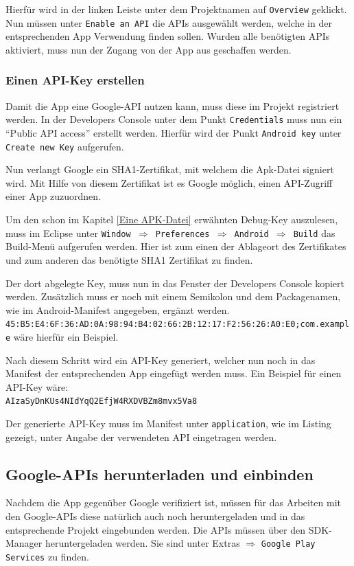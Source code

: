 Hierf\"ur wird in der linken Leiste unter dem Projektnamen auf \texttt{Overview} geklickt. Nun m\"ussen unter \texttt{Enable an API} die APIs ausgew\"ahlt werden, welche in der entsprechenden App Verwendung finden sollen. Wurden alle ben\"otigten APIs aktiviert, muss nun der Zugang von der App aus geschaffen werden. \cite{GDevMaps}

\subsubsection{Einen API-Key erstellen}
Damit die App eine Google-API nutzen kann, muss diese im Projekt registriert werden. In der Developers Console unter dem Punkt \texttt{Credentials} muss nun ein "`Public API access"' erstellt werden. Hierf\"ur wird der Punkt \texttt{Android key} unter \texttt{Create new Key} aufgerufen. 

Nun verlangt Google ein SHA1-Zertifikat, mit welchem die Apk-Datei signiert wird. Mit Hilfe von diesem Zertifikat ist es Google m\"oglich, einen API-Zugriff einer App zuzuordnen.

Um den schon im Kapitel \ref{Eine APK-Datei} erw\"ahnten Debug-Key auszulesen, muss im Eclipse unter \texttt{Window $\Rightarrow$ Preferences $\Rightarrow$ Android $\Rightarrow$ Build} das Build-Men\"u aufgerufen werden. Hier ist zum einen der Ablageort des Zertifikates und zum anderen das ben\"otigte SHA1 Zertifikat zu finden.

Der dort abgelegte Key, muss nun in das Fenster der Developers Console kopiert werden. Zus\"atzlich muss er noch mit einem Semikolon und dem Packagenamen, wie im Android-Manifest angegeben, erg\"anzt werden. \\\texttt{45:B5:E4:6F:36:AD:0A:98:94:B4:02:66:2B:12:17:F2:56:26:A0:E0;com.example} w\"are hierf\"ur ein Beispiel. 
\cite{GolemHBGoogleServices} \cite{Android44}

Nach diesem Schritt wird ein API-Key generiert, welcher nun noch in das Manifest der entsprechenden App eingef\"ugt werden muss.
Ein Beispiel f\"ur einen API-Key w\"are: \\\texttt{AIzaSyDnKUs4NIdYqQ2EfjW4RXDVBZm8mvx5Va8}

Der generierte API-Key muss im Manifest unter \texttt{application}, wie im Listing gezeigt, unter Angabe der verwendeten API eingetragen werden. 


\subsection{Google-APIs herunterladen und einbinden}
Nachdem die App gegen\"uber Google verifiziert ist, m\"ussen f\"ur das Arbeiten mit den Google-APIs diese nat\"urlich auch noch heruntergeladen und in das entsprechende Projekt eingebunden werden. Die APIs m\"ussen \"uber den \ac{SDK}-Manager heruntergeladen werden. Sie sind unter Extras $\Rightarrow$ \texttt{Google Play Services} zu finden.

